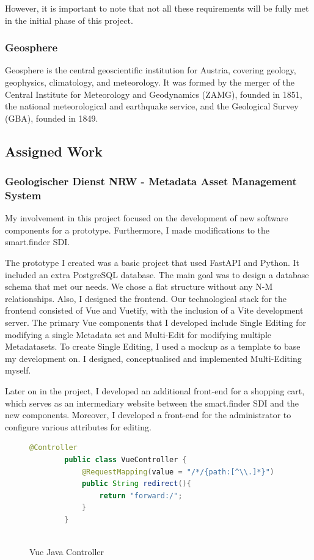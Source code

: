\documentclass[11pt, titlepage, a4paper]{article}
\begin{document}
However, it is important to note that not all these requirements will be fully met in the initial phase of this project.
\subsubsection{Geosphere}
Geosphere is the central geoscientific institution for Austria, covering geology, geophysics, climatology, and meteorology.  It was formed by the merger of the Central Institute for Meteorology and Geodynamics (ZAMG), founded in 1851, the national meteorological and earthquake service, and the Geological Survey (GBA), founded in 1849.
\subsection{Assigned Work}
\subsubsection{Geologischer Dienst NRW - Metadata Asset Management System}
My involvement in this project focused on the development of new software components for a prototype. Furthermore, I made modifications to the smart.finder SDI.


The prototype I created was a basic project that used FastAPI and Python. It included an extra PostgreSQL database. The main goal was to design a database schema that met our needs. We chose a flat structure without any N-M relationships.
Also, I designed the frontend. Our technological stack for the frontend consisted of Vue and Vuetify, with the inclusion of a Vite development server. The primary Vue components that I developed include Single Editing for modifying a single Metadata set and Multi-Edit for modifying multiple Metadatasets. To create Single Editing, I used a mockup as a template to base my development on. I designed, conceptualised and implemented Multi-Editing myself.

Later on in the project, I developed an additional front-end for a shopping cart, which serves as an intermediary website between the smart.finder SDI and the new components. Moreover, I developed a front-end for the administrator to configure various attributes for editing.

\begin{figure}[t]
    \caption{Vue Java Controller}
    \label{fig:vue}
    \begin{lstlisting}[language=java, frame=single]
        @Controller
        public class VueController {
            @RequestMapping(value = "/*/{path:[^\\.]*}")
            public String redirect(){
                return "forward:/";
            }
        }
        
        \end{lstlisting}
    \centering
\end{figure}
\end{document}
